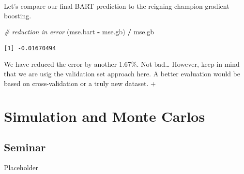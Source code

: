 \documentclass[]{article}
\newenvironment{Shaded}{\begin{snugshade}}{\end{snugshade}}
\newcommand{\CommentTok}[1]{\textcolor[rgb]{0.56,0.35,0.01}{\textit{#1}}}
\newcommand{\NormalTok}[1]{#1}
\newcommand{\OperatorTok}[1]{\textcolor[rgb]{0.81,0.36,0.00}{\textbf{#1}}}
\newcommand{\StringTok}[1]{\textcolor[rgb]{0.31,0.60,0.02}{#1}}
\begin{document}
Let's compare our final BART prediction to the reigning champion gradient boosting.

\begin{Shaded}
\begin{Highlighting}[]
\CommentTok{# reduction in error}
\NormalTok{(mse.bart }\OperatorTok{-}\StringTok{ }\NormalTok{mse.gb) }\OperatorTok{/}\StringTok{ }\NormalTok{mse.gb}
\end{Highlighting}
\end{Shaded}

\begin{verbatim}
[1] -0.01670494
\end{verbatim}

We have reduced the error by another 1.67\(\%\). Not bad\ldots{} However, keep in mind that we are usig the validation set approach here. A better evaluation would be based on cross-validation or a truly new dataset.
+

\hypertarget{simulation-and-monte-carlos}{%
\section{Simulation and Monte Carlos}\label{simulation-and-monte-carlos}}

\hypertarget{seminar-6}{%
\subsection{Seminar}\label{seminar-6}}

Placeholder
\end{document}
